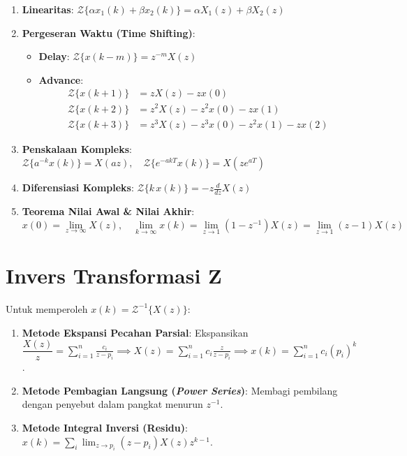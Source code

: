 \documentclass[11pt,a4paper]{article}
\begin{document}
\begin{enumerate}
    \item \textbf{Linearitas}:
    $\mathcal{Z}\{\alpha x_1(k) + \beta x_2(k)\} = \alpha X_1(z) + \beta X_2(z)$
    \item \textbf{Pergeseran Waktu (Time Shifting)}:
    \begin{itemize}
        \item \textbf{Delay}: $\mathcal{Z}\{x(k-m)\} = z^{-m} X(z)$
        \item \textbf{Advance}:
        \begin{align*}
            \mathcal{Z}\{x(k+1)\} &= z X(z) - z x(0) \\
            \mathcal{Z}\{x(k+2)\} &= z^2 X(z) - z^2 x(0) - z x(1) \\
            \mathcal{Z}\{x(k+3)\} &= z^3 X(z) - z^3 x(0) - z^2 x(1) - z x(2)
        \end{align*}
    \end{itemize}
    \item \textbf{Penskalaan Kompleks}:
    $\mathcal{Z}\{a^{-k} x(k)\} = X(az), \quad \mathcal{Z}\{e^{-akT} x(k)\} = X(z e^{aT})$
    \item \textbf{Diferensiasi Kompleks}:
    $\mathcal{Z}\{k \, x(k)\} = -z \frac{d}{dz} X(z)$
    \item \textbf{Teorema Nilai Awal \& Nilai Akhir}:
    \begin{equation*}
        x(0) = \lim_{z \to \infty} X(z), \quad \lim_{k \to \infty} x(k) = \lim_{z \to 1} (1 - z^{-1}) X(z) = \lim_{z \to 1} (z-1) X(z)
    \end{equation*}
\end{enumerate}

\vspace{6pt}

\section{Invers Transformasi Z}

Untuk memperoleh $x(k) = \mathcal{Z}^{-1}\{X(z)\}$:
\begin{enumerate}
    \item \textbf{Metode Ekspansi Pecahan Parsial}:
    Ekspansikan $\dfrac{X(z)}{z} = \sum_{i=1}^n \frac{c_i}{z - p_i} \implies X(z) = \sum_{i=1}^n c_i \frac{z}{z - p_i} \implies x(k) = \sum_{i=1}^n c_i (p_i)^k$.
    \item \textbf{Metode Pembagian Langsung (\textit{Power Series})}:
    Membagi pembilang dengan penyebut dalam pangkat menurun $z^{-1}$.
    \item \textbf{Metode Integral Inversi (Residu)}:
    $x(k) = \sum_i \lim_{z \to p_i} (z - p_i) X(z) z^{k-1}$.
\end{enumerate}
\end{document}
